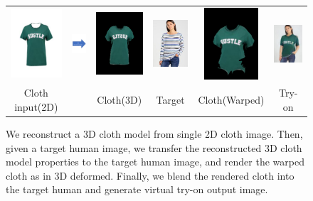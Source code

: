 \begin{figure}[t]
\begin{tabular}{cccccc}
\includegraphics[width=2cm]{figures/c2dw/000005_1.png}&
\includegraphics[width=2cm]{figures/arrow_recon.png}&
\includegraphics[width=2cm]{figures/c3drecon/000005_1_000303_0.png}&
\includegraphics[width=2cm]{figures/image/000303_0.jpg}&
\includegraphics[width=2cm]{figures/c3dwfull/000005_1_000303_0.png}&
\includegraphics[width=2cm]{figures/try-on/000005_1_000303_0.jpg}\\

  Cloth input(2D)&&Cloth(3D)&Target&Cloth(Warped)&Try-on\\

\end{tabular}

    \caption{We reconstruct a 3D cloth model from single 2D cloth image. Then, given a target human image, we transfer the reconstructed 3D cloth model properties to the target human image, and render the warped cloth as in 3D deformed. Finally, we blend the rendered cloth into the target human and generate virtual try-on output image.}
    \label{fig:summary}
    
\end{figure}




